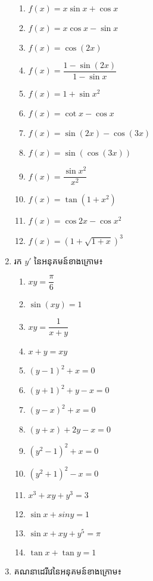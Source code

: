 \documentclass[a4paper,12pt]{article}
\begin{document}
\begin{enumerate}
\begin{multicols}{2}
\begin{enumerate}
			      \item $ f (x) = x \sin x + \cos x$
			      \item  $f(x)=x\cos x-\sin  x$
			      \item $f (x) = \cos (2 x)$
			      \item $f(x)= \dfrac{1-\sin (2x)}{1-\sin x}$
			      \item $f(x)=1+\sin x^2$
			      \item $f(x)=\cot x-\cos x$
			      \item $f(x)=\sin (2x)-\cos (3x)$
			      \item $f (x) = \sin (\cos (3x))$
			      \item $f(x)=\dfrac{\sin x^2}{ x^2}$
			      \item $f(x)=\tan (1+x^2)$
			      \item $ f(x)=\cos 2x-\cos x^2$
			      \item $f(x)= (1+\sqrt{1+x})^3$
		      \end{enumerate}
	      \end{multicols}
	\item រក $y'$ នៃអនុគមន៍ខាងក្រោម៖
	      \begin{multicols}{2}
		      \begin{enumerate}
			      \item $xy = \dfrac{ \pi}{ 6}$
			      \item $ \sin (xy) = 1$
			      \item $xy =\dfrac{1}{x+y}$
			      \item $x+y=xy$
			      \item $(y-1)^2 +x=0$
			      \item $(y+1)^2 +y-x=0$
			      \item $(y-x)^2 +x=0$
			      \item $(y+x) +2y-x=0$
			      \item $ (y^2 -1)^2 +x=0$
			      \item $ (y^2 +1)^ 2 -x=0$
			      \item $x^3+xy+y^3=3$
			      \item $\sin x+sin y=1$
			      \item $\sin x+xy+y^5 =\pi$
			      \item $\tan x+\tan y=1$
		      \end{enumerate}
	      \end{multicols}
	\item គណនាដេរីវេនៃអនុគមន៍ខាងក្រោម៖
	      \begin{multicols}{2}
		      \begin{enumerate}

\end{enumerate}
\end{multicols}
\end{enumerate}
\end{document}
